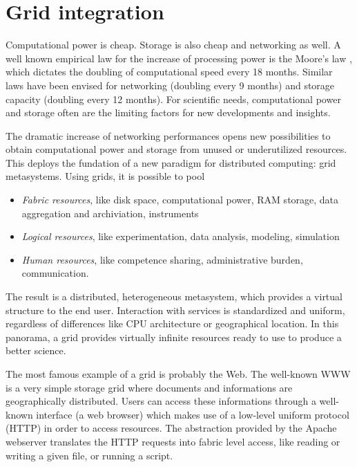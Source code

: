 \pagestyle{fancy}
\chapter{Grid integration}
\label{chp:grid}

Computational power is cheap. Storage is also cheap and networking as well.
A well known empirical law for the increase of processing power is the Moore's law
\cite{moore-law}, which dictates the doubling of computational speed every
18 months. Similar laws have been envised for networking (doubling every 9
months) and storage capacity (doubling every 12 months). For scientific
needs, computational power and storage often are the limiting factors
for new developments and insights. 

The dramatic increase of networking performances opens new possibilities to
obtain computational power and storage from unused or underutilized
resources.  This deploys the fundation of a new paradigm for distributed
computing: grid metasystems.  Using grids, it is possible to pool
\begin{itemize}
\item \textit{Fabric resources}, like disk space, computational power, RAM storage,
data aggregation and archiviation, instruments
\item \textit{Logical resources}, like experimentation, data analysis, modeling,
simulation
\item \textit{Human resources}, like competence sharing, administrative burden,
communication.
\end{itemize}
The result is a distributed, heterogeneous metasystem, which provides a
virtual structure to the end user.  Interaction with services is
standardized and uniform, regardless of differences like CPU architecture
or geographical location. In this panorama, a grid provides
virtually infinite resources ready to use to produce a better science.

The most famous example of a grid is probably the Web. The well-known WWW is
a very simple storage grid where documents and informations are
geographically distributed. Users can access these informations through a
well-known interface (a web browser) which makes use of a low-level
uniform protocol (HTTP\cite{http-site}) in order to access resources.
The abstraction provided by the Apache webserver\cite{apache-site}
translates the HTTP requests into fabric level access, like reading or
writing a given file, or running a script.

